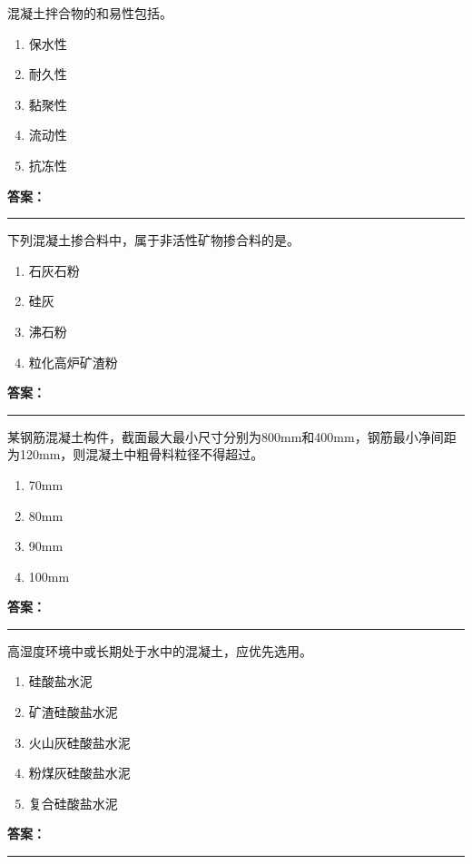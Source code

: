 \documentclass[UTF8,fontset=fandol,11pt]{ctexart}
\newcommand{\answerline}{\textcolor{answerred}{\rule{2.4cm}{0.7pt}}}
\begin{document}
\begin{quizbox}[title={第 57 题}]
混凝土拌合物的和易性包括。\\
\begin{enumerate}[label=\Alph*.]
\item 保水性
\item 耐久性
\item 黏聚性
\item 流动性
\item 抗冻性
\end{enumerate}
\textbf{\textcolor{answerred}{答案：}} \answerline
\end{quizbox}

\begin{quizbox}[title={第 58 题}]
下列混凝土掺合料中，属于非活性矿物掺合料的是。\\
\begin{enumerate}[label=\Alph*.]
\item 石灰石粉
\item 硅灰
\item 沸石粉
\item 粒化高炉矿渣粉
\end{enumerate}
\textbf{\textcolor{answerred}{答案：}} \answerline
\end{quizbox}

\begin{quizbox}[title={第 59 题}]
某钢筋混凝土构件，截面最大最小尺寸分别为800mm和400mm，钢筋最小净间距为120mm，则混凝土中粗骨料粒径不得超过。\\
\begin{enumerate}[label=\Alph*.]
\item 70mm
\item 80mm
\item 90mm
\item 100mm
\end{enumerate}
\textbf{\textcolor{answerred}{答案：}} \answerline
\end{quizbox}

\begin{quizbox}[title={第 60 题}]
高湿度环境中或长期处于水中的混凝土，应优先选用。\\
\begin{enumerate}[label=\Alph*.]
\item 硅酸盐水泥
\item 矿渣硅酸盐水泥
\item 火山灰硅酸盐水泥
\item 粉煤灰硅酸盐水泥
\item 复合硅酸盐水泥
\end{enumerate}
\textbf{\textcolor{answerred}{答案：}} \answerline
\end{quizbox}
\end{document}
